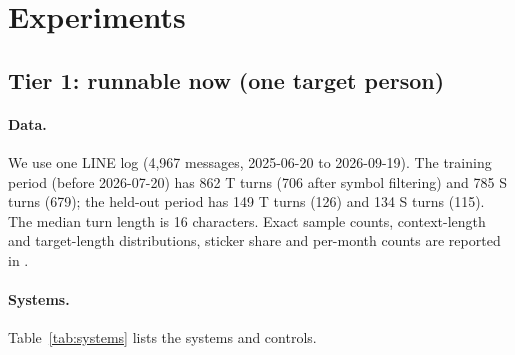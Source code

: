 
\section{Experiments}
\label{sec:experiments}

\subsection{Tier 1: runnable now (one target person)}
\label{sec:tier1}

\paragraph{Data.}
We use one LINE log (4,967 messages, 2025-06-20 to 2026-09-19).
The training period (before 2026-07-20) has 862 T turns (706 after symbol filtering) and 785 S turns (679); the held-out period has 149 T turns (126) and 134 S turns (115).
The median turn length is 16 characters.
Exact sample counts, context-length and target-length distributions, sticker share and per-month counts are reported in .

\paragraph{Systems.}
Table~\ref{tab:systems} lists the systems and controls.

